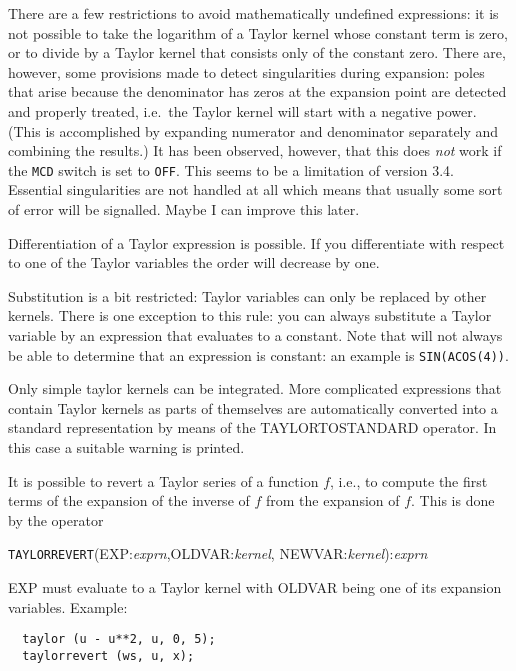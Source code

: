 There are a few restrictions to avoid mathematically undefined
expressions: it is not possible to take the logarithm of a Taylor
kernel whose constant term is zero, or to divide by a Taylor kernel
that consists only of the constant zero.  There are, however, some
provisions made to detect singularities during expansion: poles that
arise because the denominator has zeros at the expansion point are
detected and properly treated, i.e.\ the Taylor kernel will start with
a negative power.  (This is accomplished by expanding numerator and
denominator separately and combining the results.)  It has been
observed, however, that this does {\em not\/} work if the \verb|MCD|
switch is set to \verb|OFF|.  This seems to be a limitation of
\REDUCE{} version 3.4.  Essential singularities are not handled at all
which means that usually some sort of error will be signalled. Maybe I
can improve this later.

Differentiation of a Taylor expression is possible.  If you
differentiate with respect to one of the Taylor variables the order
will decrease by one. 

Substitution is a bit restricted: Taylor variables can only be replaced
by other kernels.  There is one exception to this rule: you can always
substitute a Taylor variable by an expression that evaluates to a
constant.  Note that \REDUCE{} will not always be able to determine
that an expression is constant:  an example is \verb|SIN(ACOS(4))|.

Only simple taylor kernels can be integrated. More complicated
expressions that contain Taylor kernels as parts of themselves are
automatically converted into a standard representation by means of the
TAYLORTOSTANDARD operator. In this case a suitable warning is printed.

 It is possible to revert a Taylor
series of a function $f$, i.e., to compute the first terms of the
expansion of the inverse of $f$ from the expansion of $f$. This is
done by the operator

\hspace*{2em} {\tt TAYLORREVERT}(EXP:{\em exprn},OLDVAR:{\em kernel},
                                 NEWVAR:{\em kernel}):{\em exprn}

EXP must evaluate to a Taylor kernel with OLDVAR being one of its
expansion variables. Example:

\begin{verbatim}
  taylor (u - u**2, u, 0, 5);
  taylorrevert (ws, u, x);
\end{verbatim}

